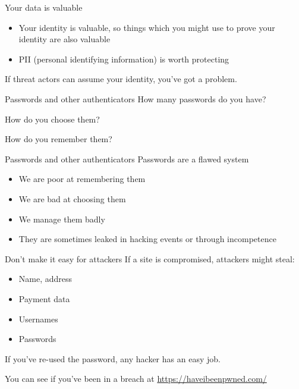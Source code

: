 \documentclass[xcolor=table]{beamer}
\begin{document}
\begin{frame}{Your data is valuable}
	\begin{itemize}
		\item Your identity is valuable, so things which you might use to prove your identity are also valuable
		\item PII (personal identifying information) is worth protecting
	\end{itemize}

	\vspace{0.5em}
	If threat actors can assume your identity, you've got a problem.
\end{frame}
\begin{frame}{Passwords and other authenticators}
	How many passwords do you have?

	\vspace{0.5em}

	How do you choose them?

	\vspace{0.5em}

	How do you remember them?
\end{frame}
\begin{frame}{Passwords and other authenticators}
		Passwords are a flawed system
	\begin{itemize}
		\item We are poor at remembering them
		\item We are bad at choosing them
		\item We manage them badly
		\item They are sometimes leaked in hacking events or through incompetence
	\end{itemize}
\end{frame}
\begin{frame}{Don't make it easy for attackers}
	If a site is compromised, attackers might steal:
	\begin{itemize}
		\item Name, address
		\item Payment data
		\item Usernames 
		\item Passwords 
	\end{itemize}
	If you've re-used the password, any hacker has an easy job.

	\vspace{0.5em}
	
	You can see if you've been in a breach at \url{https://haveibeenpwned.com/}
\end{frame}
\end{document}
